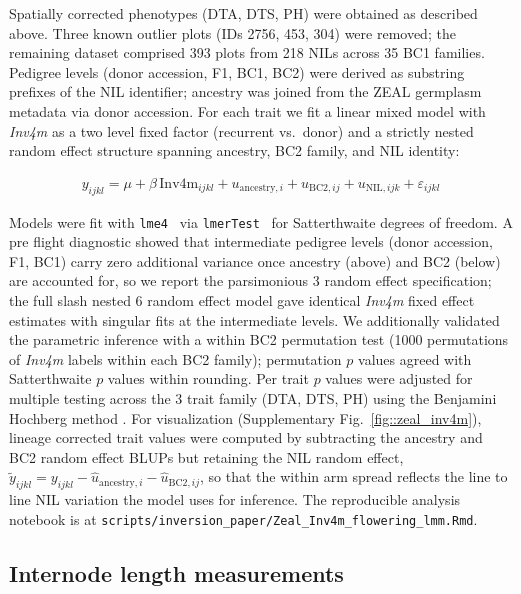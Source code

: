\documentclass[9pt,twocolumn,twoside]{rilabRxiv}
\newcommand{\invfour}{\textit{Inv4m}\xspace}
\begin{document}
Spatially corrected phenotypes (DTA, DTS, PH) were obtained as described above.
Three known outlier plots (IDs 2756, 453, 304) were removed; the remaining dataset comprised 393 plots from 218 NILs across 35 BC1 families.
Pedigree levels (donor accession, F1, BC1, BC2) were derived as substring prefixes of the NIL identifier; ancestry was joined from the ZEAL germplasm metadata via donor accession.
For each trait we fit a linear mixed model with \invfour as a two level fixed factor (recurrent vs.\ donor) and a strictly nested random effect structure spanning ancestry, BC2 family, and NIL identity:

\begin{eqnarray}
\label{eq:zeal_lmm}
y_{ijkl} = \mu + \beta\,\mathrm{Inv4m}_{ijkl} + u_{\text{ancestry},i} + u_{\text{BC2},ij} + u_{\text{NIL},ijk} + \varepsilon_{ijkl}
\end{eqnarray}

Models were fit with \texttt{lme4}~\cite{bates2015} via \texttt{lmerTest}~\cite{kuznetsova2017} for Satterthwaite degrees of freedom.
A pre flight diagnostic showed that intermediate pedigree levels (donor accession, F1, BC1) carry zero additional variance once ancestry (above) and BC2 (below) are accounted for, so we report the parsimonious 3 random effect specification; the full slash nested 6 random effect model gave identical \invfour fixed effect estimates with singular fits at the intermediate levels.
We additionally validated the parametric inference with a within BC2 permutation test (1000 permutations of \invfour labels within each BC2 family); permutation $p$ values agreed with Satterthwaite $p$ values within rounding.
Per trait $p$ values were adjusted for multiple testing across the 3 trait family (DTA, DTS, PH) using the Benjamini Hochberg method \cite{benjamini1995}.
For visualization (Supplementary Fig.~\ref{fig::zeal_inv4m}), lineage corrected trait values were computed by subtracting the ancestry and BC2 random effect BLUPs but retaining the NIL random effect, $\tilde{y}_{ijkl} = y_{ijkl} - \hat{u}_{\text{ancestry},i} - \hat{u}_{\text{BC2},ij}$, so that the within arm spread reflects the line to line NIL variation the model uses for inference.
The reproducible analysis notebook is at \texttt{scripts/inversion\_paper/Zeal\_Inv4m\_flowering\_lmm.Rmd}.

\subsection{Internode length measurements}
\end{document}
